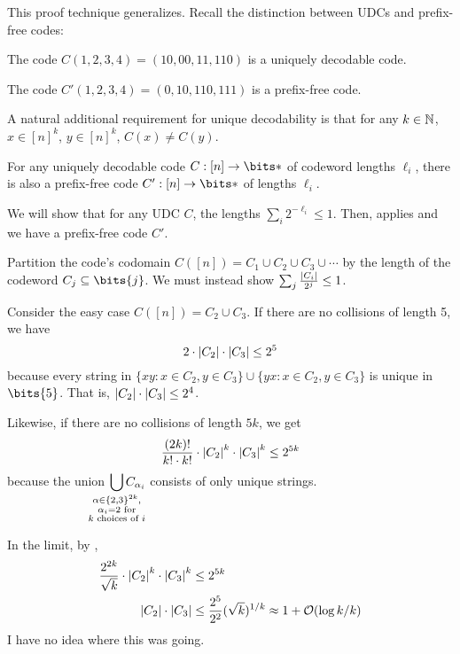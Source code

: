 \documentclass[class=co432,notes,tikz]{agony}
\begin{document}
This proof technique generalizes.
Recall the distinction between UDCs and prefix-free codes:


\begin{example}
  The code $C(1,2,3,4) = (10,00,11,110)$ is a uniquely decodable code.

  The code $C'(1,2,3,4) = (0,10,110,111)$ is a prefix-free code.
\end{example}

\begin{remark}
  A natural additional requirement for unique decodability
  is that for any $k \in \mathbb{N}$, $x \in [n]^k$, $y \in [n]^k$, $C(x) \neq C(y)$.
\end{remark}

\begin{theorem}
  For any uniquely decodable code $C : [n] \to \bits*$ of codeword lengths $\ell_i$,
  there is also a prefix-free code $C' : [n] \to \bits*$ of lengths $\ell_i$.
\end{theorem}

We will show that for any UDC $C$, the lengths $\sum_i 2^{-\ell_i} \leq 1$.
Then,  applies and we have a prefix-free code $C'$.

Partition the code's codomain $C([n]) = C_1 \cup C_2 \cup C_3 \cup \cdots$
by the length of the codeword $C_j \subseteq \bits{j}$.
We must instead show $\sum_j \frac{\abs{C_i}}{2^j} \leq 1$.

Consider the easy case $C([n]) = C_2 \cup C_3$.
If there are no collisions of length 5,
we have \[ 2 \cdot \abs{C_2} \cdot \abs{C_3} \leq 2^5 \]
because every string in $\{xy : x \in C_2, y \in C_3\} \cup \{yx : x \in C_2, y \in C_3\}$
is unique in $\bits{5}$.
That is, $\abs{C_2} \cdot \abs{C_3} \leq 2^4$.

Likewise, if there are no collisions of length $5k$, we get
\[ \frac{(2k)!}{k! \cdot k!} \cdot \abs{C_2}^k \cdot \abs{C_3}^k \leq 2^{5k} \]
because the union
$\displaystyle\bigcup_{\mathclap{\substack{\alpha \in \{2,3\}^{2k}, \\ \alpha_i = 2\text{ for} \\ \text{$k$ choices of $i$}}}} C_{\alpha_i}$
consists of only unique strings.

In the limit, by ,
\begin{align*}
  \frac{2^{2k}}{\sqrt{k}} \cdot \abs{C_2}^k \cdot \abs{C_3}^k & \leq 2^{5k}                                                         \\
  \abs{C_2}\cdot\abs{C_3}                                     & \leq \frac{2^5}{2^2}(\sqrt{k})^{1/k} \approx 1 + \order{\log k / k}
\end{align*}
I have no idea where this was going.
\end{document}
